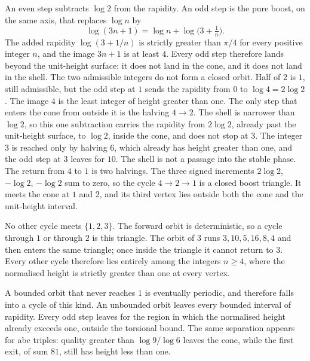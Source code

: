 \documentclass[a4paper]{article}
\theoremstyle{definition}
\theoremstyle{remark}
\begin{document}
An even step subtracts \(\log 2\) from the rapidity. An odd step is the pure boost, on the same axis, that replaces \(\log n\) by
\[
\log(3n+1)=\log n+\log\bigl(3+\tfrac1n\bigr).
\]
The added rapidity \(\log(3+1/n)\) is strictly greater than \(\pi/4\) for every positive integer \(n\), and the image \(3n+1\) is at least \(4\). Every odd step therefore lands beyond the unit-height surface: it does not land in the cone, and it does not land in the shell. The two admissible integers do not form a closed orbit. Half of \(2\) is \(1\), still admissible, but the odd step at \(1\) sends the rapidity from \(0\) to \(\log 4=2\log 2\). The image \(4\) is the least integer of height greater than one. The only step that enters the cone from outside it is the halving \(4\to 2\). The shell is narrower than \(\log 2\), so this one subtraction carries the rapidity from \(2\log 2\), already past the unit-height surface, to \(\log 2\), inside the cone, and does not stop at \(3\). The integer \(3\) is reached only by halving \(6\), which already has height greater than one, and the odd step at \(3\) leaves for \(10\). The shell is not a passage into the stable phase. The return from \(4\) to \(1\) is two halvings. The three signed increments \(2\log 2\), \(-\log 2\), \(-\log 2\) sum to zero, so the cycle \(4\to 2\to 1\) is a closed boost triangle. It meets the cone at \(1\) and \(2\), and its third vertex lies outside both the cone and the unit-height interval.

No other cycle meets \(\{1,2,3\}\). The forward orbit is deterministic, so a cycle through \(1\) or through \(2\) is this triangle. The orbit of \(3\) runs \(3,10,5,16,8,4\) and then enters the same triangle; once inside the triangle it cannot return to \(3\). Every other cycle therefore lies entirely among the integers \(n\ge 4\), where the normalised height is strictly greater than one at every vertex.

A bounded orbit that never reaches \(1\) is eventually periodic, and therefore falls into a cycle of this kind. An unbounded orbit leaves every bounded interval of rapidity. Every odd step leaves for the region in which the normalised height already exceeds one, outside the torsional bound. The same separation appears for abc triples: quality greater than \(\log 9/\log 6\) leaves the cone, while the first exit, of sum \(81\), still has height less than one.
\end{document}
